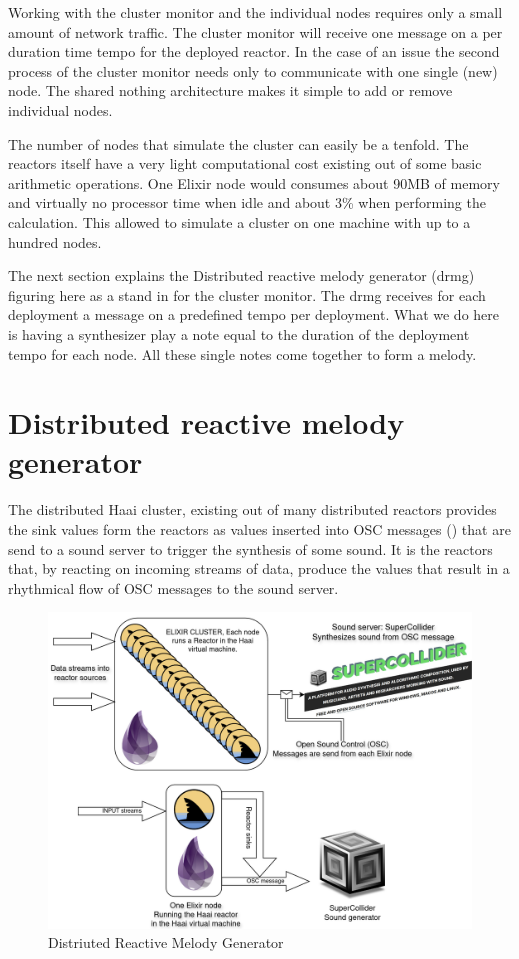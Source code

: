 \documentclass[a4paper]{book}
\begin{document}
Working with the cluster monitor and the individual nodes requires only a small amount of network traffic. The cluster monitor will receive one message on a per duration time tempo for the deployed reactor. In the case of an issue the second process of the cluster monitor needs only to communicate with one single (new) node. The shared nothing architecture makes it simple to add or remove individual nodes.

The number of nodes that simulate the cluster can easily be a tenfold. The reactors itself have a very light computational cost existing out of some basic arithmetic operations. One Elixir node would consumes about 90MB of memory and virtually no processor time when idle and about 3\% when performing the calculation. This allowed to simulate a cluster on one machine with up to a hundred nodes. 

The next section explains the Distributed reactive melody generator (drmg) figuring here as a stand in for the cluster monitor. The drmg receives for each deployment a message on a predefined tempo per deployment. What we do here is having a synthesizer play a note equal to the duration of the deployment tempo for each node. All these single notes come together to form a melody. 
  

\section{Distributed reactive melody generator}
The distributed Haai cluster, existing out of many distributed reactors provides the sink values form the reactors as values inserted into OSC messages (\cite{schmeder2010best}) that are send to a sound server to trigger the synthesis of some sound. It is the reactors that, by reacting on incoming streams of data, produce the values that result in a rhythmical flow of OSC messages to the sound server. 

\begin{figure}[h]
	\includegraphics[width=\textwidth]{drmg200.drawio}
	\caption{Distriuted Reactive Melody Generator}
	\label{fig:drmg}
\end{figure}
 
\end{document}
